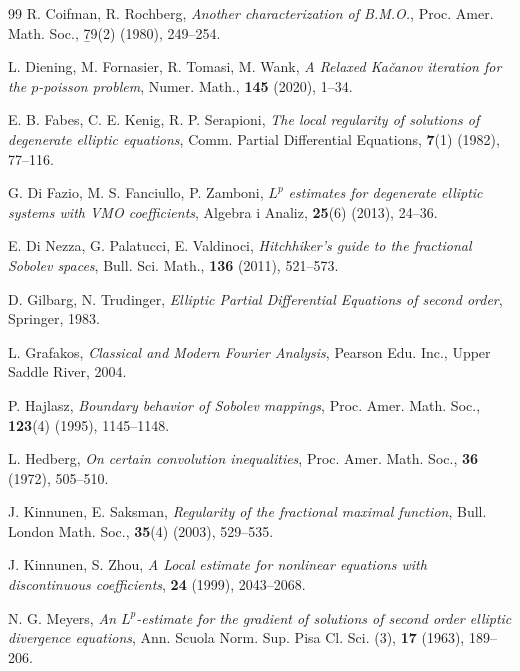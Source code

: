 \documentclass[a4paper, 11pt]{article}
\begin{document}
\begin{thebibliography}{99}
 R. Coifman, R. Rochberg, {\em Another characterization of B.M.O.}, Proc. Amer. Math. Soc., {\b 79}(2) (1980), 249--254.

 L. Diening, M. Fornasier, R. Tomasi, M. Wank, {\em A Relaxed Ka{\v c}anov iteration for the $p$-poisson problem}, Numer. Math., {\bf 145} (2020), 1--34.

 E. B. Fabes, C. E. Kenig, R. P. Serapioni, {\em The local regularity of solutions of degenerate elliptic equations}, Comm. Partial Differential Equations, {\bf 7}(1) (1982), 77--116.

 G. Di Fazio, M. S. Fanciullo, P. Zamboni, {\em $L^p$ estimates for degenerate elliptic systems with VMO coefficients}, Algebra i Analiz, {\bf 25}(6) (2013), 24--36.

 E. Di Nezza, G. Palatucci, E. Valdinoci, {\em Hitchhiker’s guide to the fractional Sobolev spaces}, Bull. Sci. Math., {\bf 136} (2011), 521--573.


 D. Gilbarg, N. Trudinger, {\em Elliptic Partial Differential Equations of second order}, Springer, 1983.

 L. Grafakos, {\em Classical and Modern Fourier Analysis}, Pearson Edu. Inc., Upper Saddle River, 2004.

 P. Hajlasz, {\em Boundary behavior of Sobolev mappings}, Proc. Amer. Math. Soc., {\bf 123}(4) (1995), 1145--1148.

 L. Hedberg, {\em On certain convolution inequalities}, Proc. Amer. Math. Soc., {\bf 36} (1972), 505--510.

 J. Kinnunen, E. Saksman, {\em Regularity of the fractional maximal function},  Bull. London Math. Soc., {\bf 35}(4) (2003), 529--535.

 J. Kinnunen, S. Zhou, {\em A Local estimate for nonlinear equations with discontinuous coefficients}, {\bf 24} (1999),  2043--2068.

 N. G. Meyers, {\em An $L^p$-estimate for the gradient of solutions of second order elliptic divergence equations}, Ann. Scuola Norm. Sup. Pisa Cl. Sci. (3), {\bf 17} (1963), 189--206.



\end{thebibliography}
\end{document}
